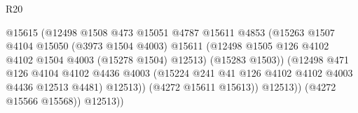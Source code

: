 \begin{lexlean}{R20}
\begin{coremodule}
                                              @15615
                                              (@12498
                                                @1508
                                                @473
                                                @15051
                                                @4787
                                                @15611
                                                @4853
                                                (@15263
                                                  @1507
                                                  @4104
                                                  @15050
                                                  (@3973 @1504 @4003)
                                                  @15611
                                                  (@12498
                                                    @1505
                                                    @126
                                                    @4102
                                                    @4102
                                                    @1504
                                                    @4003
                                                    (@15278 @1504)
                                                    @12513)
                                                  (@15283 @1503))
                                                (@12498
                                                  @471
                                                  @126
                                                  @4104
                                                  @4102
                                                  @4436
                                                  @4003
                                                  (@15224
                                                    @241
                                                    @41
                                                    @126
                                                    @4102
                                                    @4102
                                                    @4003
                                                    @4436
                                                    @12513
                                                    @4481)
                                                  @12513))
                                              (@4272 @15611 @15613))
                                            @12513))
                                        (@4272 @15566 @15568))
                                      @12513))

\end{coremodule}
\end{lexlean}

